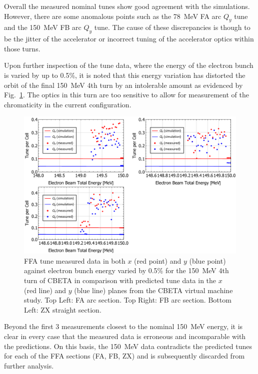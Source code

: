 \documentclass[../main.tex]{subfiles}
\begin{document}
Overall the measured nominal tunes show good agreement with the simulations. However, there are some anomalous points such as the 78~\si{\mega\electronvolt} FA arc $Q_{y}$ tune and the 150~\si{\mega\electronvolt} FB arc $Q_{y}$ tune. The cause of these discrepancies is though to be the jitter of the accelerator or incorrect tuning of the accelerator optics within those turns.

Upon further inspection of the tune data, where the energy of the electron bunch is varied by up to 0.5\%, it is noted that this energy variation has distorted the orbit of the final 150~\si{\mega\electronvolt} 4th turn by an intolerable amount as evidenced by Fig.~\ref{fig:FAFBZX_150_tunes}. The optics in this turn are too sensitive to allow for measurement of the chromaticity in the current configuration.

\begin{figure}[!h]
\centering
\includegraphics[width=\textwidth]{Figures/CBETA_Multi-Pass_Commissioning/chromaticity/FAFBZX_150_tunes.pdf}
\caption{FFA tune measured data in both $x$ (red point) and $y$ (blue point) against electron bunch energy varied by 0.5\% for the 150~\si{\mega\electronvolt} 4th turn of CBETA in comparison with predicted tune data in the $x$ (red line) and $y$ (blue line) planes from the CBETA virtual machine study. Top Left: FA arc section. Top Right: FB arc section. Bottom Left: ZX straight section.}
\label{fig:FAFBZX_150_tunes}
\end{figure}

Beyond the first 3 measurements closest to the nominal 150~\si{\mega\electronvolt} energy, it is clear in every case that the measured data is erroneous and incomparable with the predictions. On this basis, the 150~\si{\mega\electronvolt} data contradicts the predicted tunes for each of the FFA sections (FA, FB, ZX) and is subsequently discarded from further analysis.
\end{document}
